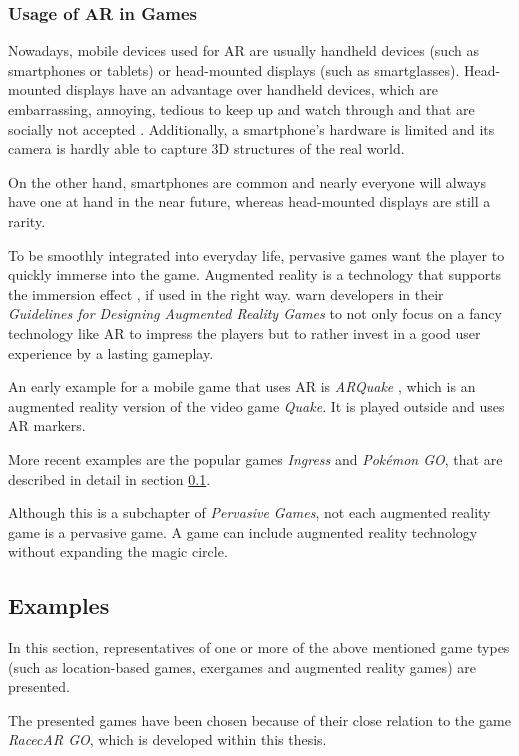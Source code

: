 \subsubsection{Usage of AR in Games}\label{sec:usageOfARStateOfTheArt}
Nowadays, mobile devices used for AR are usually handheld devices (such as smartphones or tablets) or head-mounted displays (such as smartglasses). Head-mounted displays have an advantage over handheld devices, which are embarrassing, annoying, tedious to keep up and watch through and that are socially not accepted \citep{smartphoneAR}. Additionally, a smartphone's hardware is limited and its camera is hardly able to capture 3D structures of the real world.

On the other hand, smartphones are common and nearly everyone will always have one at hand in the near future, whereas head-mounted displays are still a rarity.

To be smoothly integrated into everyday life, pervasive games want the player to quickly immerse into the game. Augmented reality is a technology that supports the immersion effect \citep{waern2009three}, if used in the right way. \citeauthor{wetzel2008guidelines} warn developers in their \emph{Guidelines for Designing Augmented Reality Games} \citep{wetzel2008guidelines} to not only focus on a fancy technology like AR to impress the players but to rather invest in a good user experience by a lasting gameplay.

An early example for a mobile game that uses AR is \emph{ARQuake} \citep{piekarski2002arquake}, which is an augmented reality version of the video game \emph{Quake}. It is played outside and uses AR markers.

More recent examples are the popular games \emph{Ingress} and \emph{Pok\'{e}mon GO}, that are described in detail in section \ref{sec:examples}.

Although this is a subchapter of \emph{Pervasive Games}, not each augmented reality game is a pervasive game. A game can include augmented reality technology without expanding the magic circle.

\subsection{Examples}\label{sec:examples}
In this section, representatives of one or more of the above mentioned game types (such as location-based games, exergames and augmented reality games) are presented.

The presented games have been chosen because of their close relation to the game \emph{RacecAR GO}, which is developed within this thesis.

